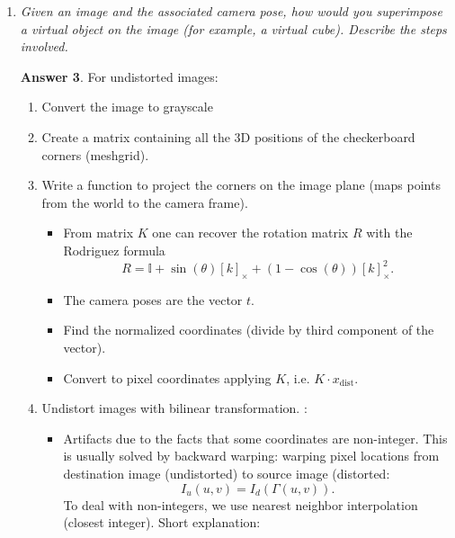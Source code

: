 \documentclass[a4paper,12 pt]{article}
\theoremstyle{definition}
\theoremstyle{remark}
\theoremstyle{definition}
\theoremstyle{definition}
\theoremstyle{definition}
\theoremstyle{definition}
\theoremstyle{remark}
\theoremstyle{remark}
\theoremstyle{definition}
\theoremstyle{definition}
\newtheorem*{answer}{Answer}
\begin{document}
\begin{enumerate}
\begin{enumerate}
\begin{answer}
\end{answer}
\item \textit{What do we mean by normalized image coordinates on the unit sphere?}
\begin{answer}
Projecting the image point $P=(x,y,z)$ from the \textbf{ mirror reference frame} to the  \textbf{unit sphere} using Eq.  \ref{nomalize P to unit sphere}.
\end{answer}
\end{enumerate}
\item \textit{Given an image and the associated camera pose, how would you superimpose a virtual object on the image (for example, a virtual cube). Describe the steps involved.}
\begin{answer}
For undistorted images:
\begin{enumerate}
\item Convert the image to grayscale
\item Create a matrix containing all the 3D positions of the checkerboard corners (meshgrid).
\item Write a function to project the corners on the image plane (maps points from the world to the camera frame).
\begin{itemize}
\item From matrix $K$ one can recover the rotation matrix $R$ with the Rodriguez formula
\begin{equation}
R=\mathbb{I}+\sin(\theta) [k]_{\times}+(1-\cos(\theta))[k]_\times ^2.
\end{equation}
\item The camera poses are the vector $t$.
\item Find the normalized coordinates (divide by third component of the vector).
\item Convert to pixel coordinates applying $K$, i.e. $K\cdot x_{\text{dist}}$.
\end{itemize}
\item Undistort images with bilinear transformation.
:
\begin{itemize}
\item Artifacts due to the facts that some coordinates are non-integer. This is usually solved by backward warping: warping pixel locations from destination image (undistorted) to source image (distorted: 
\begin{equation}
I_u(u,v)=I_d(\Gamma(u,v)).
\end{equation}
To deal with non-integers, we use nearest neighbor interpolation (closest integer). Short explanation: \\

\end{itemize}
\end{enumerate}
\end{answer}
\end{enumerate}
\end{document}
